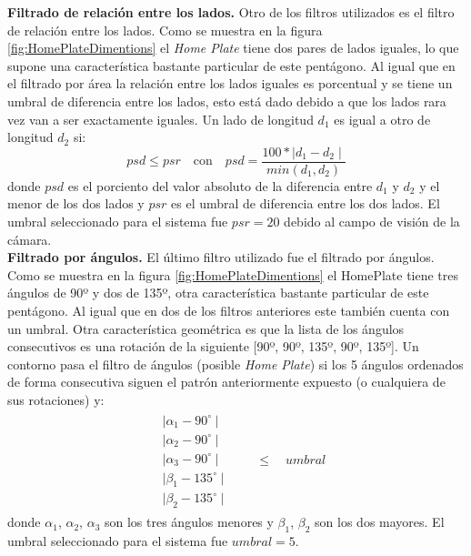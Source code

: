 \textbf{Filtrado de relación entre los lados.}
Otro de los filtros utilizados es el filtro de relación entre los lados. Como se muestra en la figura \ref{fig:HomePlateDimentions} el \textit{Home Plate} tiene dos pares de lados iguales, lo que supone una característica bastante particular de este pentágono. Al igual que en el filtrado por área la relación entre los lados iguales es porcentual y se tiene un umbral de diferencia entre los lados, esto está dado debido a que los lados rara vez van a ser exactamente iguales. Un lado de longitud $d_1$ es igual a otro de longitud $d_2$ si:
$$psd \leq psr \quad \text{con} \quad psd = \frac{100 * \mid d_1 - d_2 \mid}{min(d_1, d_2)}$$
donde $psd$ es el porciento del valor absoluto de la diferencia entre $d_1$ y $d_2$ y el menor de los dos lados y $psr$ es el umbral de diferencia entre los dos lados. El umbral seleccionado para el sistema fue $psr = 20$ debido al campo de visión de la cámara.\\

\textbf{Filtrado por ángulos.}
El último filtro utilizado fue el filtrado por ángulos. Como se muestra en la figura \ref{fig:HomePlateDimentions} el HomePlate tiene tres ángulos de 90º y dos de 135º, otra característica bastante particular de este pentágono. Al igual que en dos de los filtros anteriores este también cuenta con un umbral. Otra característica geométrica es que la lista de los ángulos consecutivos es una rotación de la siguiente [90º, 90º, 135º, 90º, 135º]. Un contorno pasa el filtro de ángulos (posible \textit{Home Plate}) si los 5 ángulos ordenados de forma consecutiva siguen el patrón anteriormente expuesto (o cualquiera de sus rotaciones) y:
\begin{equation*}
	\begin{split}
		\begin{split}
			& \mid \alpha_1 - 90^{\circ} \mid \\
			& \mid \alpha_2 - 90^{\circ} \mid \\
			& \mid \alpha_3 - 90^{\circ} \mid \\
			& \mid \beta_1 - 135^{\circ} \mid \\
			& \mid \beta_2 - 135^{\circ} \mid
		\end{split}
		& \quad \leq \quad umbral
	\end{split}
\end{equation*}
donde $\alpha_1$, $\alpha_2$, $\alpha_3$ son los tres ángulos menores y $\beta_1$, $\beta_2$ son los dos mayores. El umbral seleccionado para el sistema fue $umbral = 5$.

